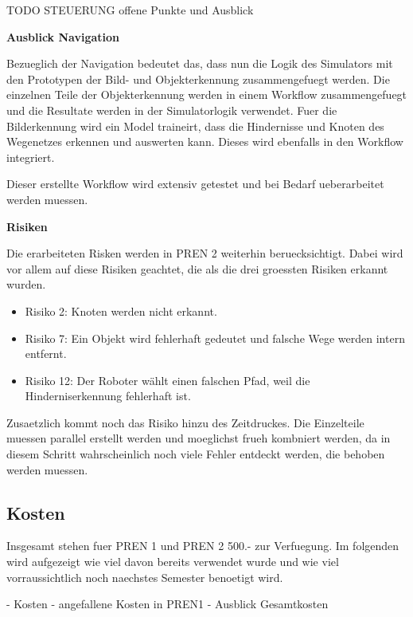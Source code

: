 TODO STEUERUNG offene Punkte und Ausblick

\textbf{Ausblick Navigation}

Bezueglich der Navigation bedeutet das, dass nun die Logik des Simulators mit den Prototypen der Bild- und Objekterkennung zusammengefuegt werden. Die einzelnen Teile der Objekterkennung werden in einem Workflow zusammengefuegt und die Resultate werden in der Simulatorlogik verwendet. Fuer die Bilderkennung wird ein Model traineirt, dass die Hindernisse und Knoten des Wegenetzes erkennen und auswerten kann. Dieses wird ebenfalls in den Workflow integriert.

Dieser erstellte Workflow wird extensiv getestet und bei Bedarf ueberarbeitet werden muessen.

\textbf{Risiken}

Die erarbeiteten Risken werden in PREN 2 weiterhin beruecksichtigt. Dabei wird vor allem auf diese Risiken geachtet, die als die drei groessten Risiken erkannt wurden.

\begin{itemize}
    \item Risiko 2: Knoten werden nicht erkannt.
    \item Risiko 7: Ein Objekt wird fehlerhaft gedeutet und falsche Wege werden intern entfernt.
    \item Risiko 12: Der Roboter wählt einen falschen Pfad, weil die Hinderniserkennung fehlerhaft ist.
\end{itemize}

Zusaetzlich kommt noch das Risiko hinzu des Zeitdruckes. Die Einzelteile muessen parallel erstellt werden und moeglichst frueh kombniert werden, da in diesem Schritt wahrscheinlich noch viele Fehler entdeckt werden, die behoben werden muessen. 

\subsection{Kosten}\label{kosten}

Insgesamt stehen fuer PREN 1 und PREN 2 500.- zur Verfuegung. Im folgenden wird aufgezeigt wie viel davon bereits verwendet wurde und wie viel vorraussichtlich noch naechstes Semester benoetigt wird.

- Kosten
- angefallene Kosten in PREN1
- Ausblick Gesamtkosten

